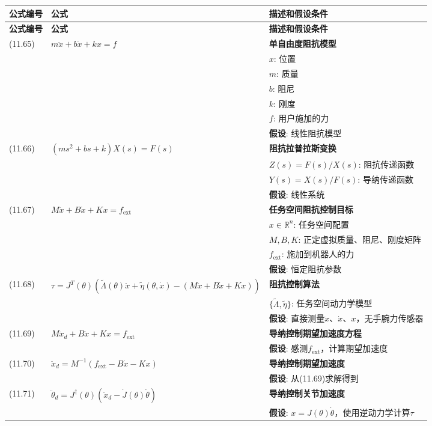 \documentclass[12pt,a4paper]{article}
\begin{document}
\begin{longtable}{|p{}|p{}|p{}|}
\hline
\textbf{公式编号} & \textbf{公式} & \textbf{描述和假设条件} \\
\hline
\endfirsthead
\hline
\textbf{公式编号} & \textbf{公式} & \textbf{描述和假设条件} \\
\hline
\endhead
\hline
\endfoot
\hline
\endlastfoot

(11.65) & $m\ddot{x} + b\dot{x} + kx = f$ & 
\textbf{单自由度阻抗模型} \\
& & $x$: 位置 \\
& & $m$: 质量 \\
& & $b$: 阻尼 \\
& & $k$: 刚度 \\
& & $f$: 用户施加的力 \\
& & \textbf{假设}: 线性阻抗模型 \\
\hline

(11.66) & $(ms^2 + bs + k)X(s) = F(s)$ & 
\textbf{阻抗拉普拉斯变换} \\
& & $Z(s) = F(s)/X(s)$: 阻抗传递函数 \\
& & $Y(s) = X(s)/F(s)$: 导纳传递函数 \\
& & \textbf{假设}: 线性系统 \\
\hline

(11.67) & $M\ddot{x} + B\dot{x} + Kx = f_{\text{ext}}$ & 
\textbf{任务空间阻抗控制目标} \\
& & $x \in \mathbb{R}^n$: 任务空间配置 \\
& & $M, B, K$: 正定虚拟质量、阻尼、刚度矩阵 \\
& & $f_{\text{ext}}$: 施加到机器人的力 \\
& & \textbf{假设}: 恒定阻抗参数 \\
\hline

(11.68) & $\tau = J^T(\theta)\left(\tilde{\Lambda}(\theta)\ddot{x} + \tilde{\eta}(\theta, \dot{x}) - (M\ddot{x} + B\dot{x} + Kx)\right)$ & 
\textbf{阻抗控制算法} \\
& & $\{\tilde{\Lambda}, \tilde{\eta}\}$: 任务空间动力学模型 \\
& & \textbf{假设}: 直接测量$\ddot{x}$、$\dot{x}$、$x$，无手腕力传感器 \\
\hline

(11.69) & $M\ddot{x}_d + B\dot{x} + Kx = f_{\text{ext}}$ & 
\textbf{导纳控制期望加速度方程} \\
& & \textbf{假设}: 感测$f_{\text{ext}}$，计算期望加速度 \\
\hline

(11.70) & $\ddot{x}_d = M^{-1}(f_{\text{ext}} - B\dot{x} - Kx)$ & 
\textbf{导纳控制期望加速度} \\
& & \textbf{假设}: 从(11.69)求解得到 \\
\hline

(11.71) & $\ddot{\theta}_d = J^{\dagger}(\theta)(\ddot{x}_d - \dot{J}(\theta)\dot{\theta})$ & 
\textbf{导纳控制关节加速度} \\
& & \textbf{假设}: $x = J(\theta)\dot{\theta}$，使用逆动力学计算$\tau$ \\
\hline

\end{longtable}
\end{document}
